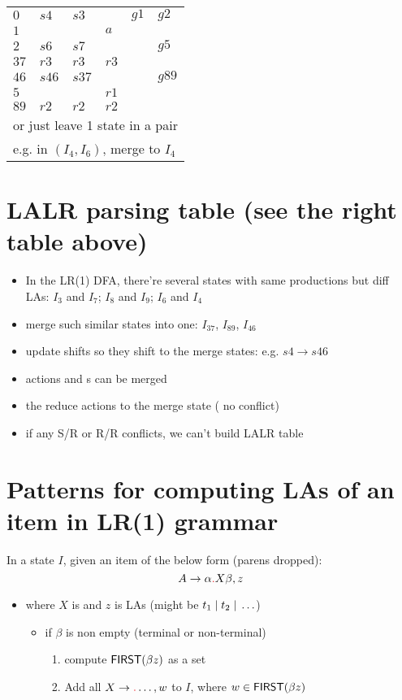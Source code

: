 \documentclass[10pt,a4paper,landscape]{article}
\begin{document}
\begin{multicols*}{3}
\begin{minipage}{.5\linewidth}
\begin{tabular}{l|lll|ll}
    \hline
    $0$ & $s4$ & $s3$ &     & $g1$ & $g2$ \\
    $1$ &      &      & $a$ &      &      \\
    $2$ & $s6$ & $s7$ &  &      & $g5$ \\
    $37$ & $r3$ & $r3$ & $r3$  &   &  \\
    $46$ & $s46$  & $s37$  &   &   & $g89$ \\
    $5$ &   &   & $r1$  &   &  \\
    $89$ & $r2$  & $r2$  & $r2$ &   &  \\
    \hline
    \multicolumn{6}{l}{or just leave 1 state in a pair}\\
    \multicolumn{6}{l}{e.g. in $(I_4, I_6)$, merge to $I_4$}  \\
    \hline
  \end{tabular}
\end{minipage}
\section*{LALR parsing table (see the right table above)}
\begin{itemize}
\item In the LR(1) DFA, there're several states with same productions but diff LAs: $I_3$ and $I_7$; $I_8$ and $I_9$; $I_6$ and $I_4$
\item merge such similar states into one: $I_{37}$, $I_{89}$, $I_{46}$
\item update shifts so they shift to the merge states: e.g. $s4\to s46$
\item {}  actions and s can be merged
\item {} the reduce actions to the merge state ( no conflict)
\item if any S/R or R/R conflicts, we can't build LALR table
\end{itemize}
\section*{Patterns for computing LAs of an item in LR(1) grammar}
In a state $I$, given an item of the below form (parens dropped):
  \[
    A\to \alpha\lrd X\beta, z
  \]
\begin{itemize}
\item where $X$ is  and $z$ is LAs (might be $t_1\;|\; t_2\;|\;\ldots$)
  \begin{itemize}[leftmargin=3em]
  \item if $\beta$ is non empty (terminal or non-terminal)
    \begin{enumerate}
    \item compute $\mfn{first}(\beta z)$ as a set
    \item Add all $X\to\lrd \ldots, w$ to $I$, where $w \in \mfn{first}(\beta z)$


\end{enumerate}
\end{itemize}
\end{itemize}
\end{multicols*}
\end{document}
